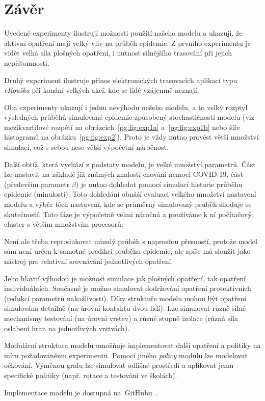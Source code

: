 \section*{Závěr}

Uvedené experimenty ilustrují možnosti použití našeho modelu a
ukazují, že aktivní opatření mají velký vliv na průběh epidemie. Z
prvního experimentu je vidět velká síla plošných opatření, i nutnost
silnějšího trasování při jejich nepřítomnosti.

Druhý experiment ilustruje přínos elektronických trasovacích aplikací
typu {\em eRouška} při konání velkých akcí, kde se lidé vzájemně
neznají.

Oba experimenty ukazují i jednu nevýhodu našeho modelu, a to velký rozptyl 
výsledných průběhů simulované epidemie způsobený stochastičností modelu (viz mezikvartilové rozpětí na
obrázcích~\ref{pg:fig:exp1a} a~\ref{pg:fig:exp1b} nebo šíře histogramů
na obrázku~\ref{pg:fig:exp2}). Proto je vždy nutno provést větší množství
simulací, což s sebou nese větší výpočetní náročnost.

Další obtíž, která vychází z podstaty modelu, je velké množství parametrů. Část lze nastavit na základě
již známých znalostí chování nemoci COVID-19, část (především parametr $\beta$) je nutno dohledat pomocí simulací historie průběhu epidemie (minulosti). Toto dohledání obnáší evaluaci velkého množství nastavení modelu a výběr těch nastavení, kde se průměrný simulovaný průběh shoduje se skutečností. Tato fáze je výpočetně velmi náročná a používáme k ní počítačový cluster s větším množstvím procesorů. 

Není ale třeba reprodukovat minulý průběh s naprostou přesností, protože model sám není určen k samotné predikci průběhu epidemie, ale spíše má sloužit  jako nástroj pro relativní srovnávání jednotlivých opatření. 

Jeho hlavní výhodou je možnost simulace jak plošných opatření, tak
opatření individuálních. Současně je možno simulovat dodržování
opatření protektivních (redukcí parametrů nakažlivosti). Díky
struktuře modelu mohou být opatření simulována detailně (na úrovni
kontaktu dvou lidí). Lze simulovat různě silné mechanismy testování
(na úrovni vrstev) a různé stupně izolace (různá síla oslabení hran
na jednotlivých vrstvách).


Modulární struktura modelu umožňuje implementovat další opatření a
politiky na míru požadovanému experimentu. Pomocí jiného {\em policy}
modulu lze modelovat očkování. Výměnou grafu lze simulovat odlišné
prostředí a aplikovat jemu specifické politiky (např. rotace a testování
ve školách).

Implementace modelu je dostupná na~GitHubu~\cite{pg:mmsoft}.
